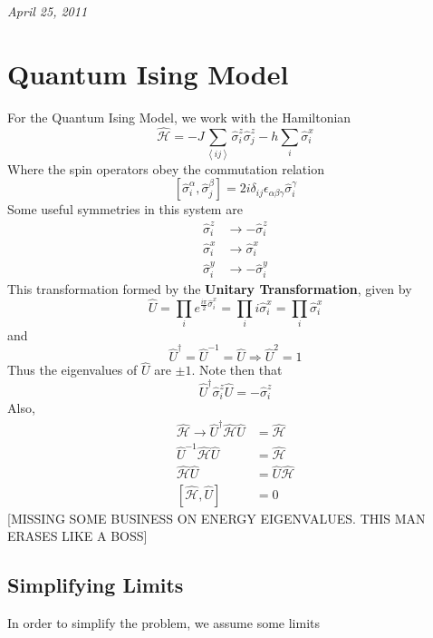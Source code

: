 \documentclass{article}
\begin{document}
	\textit{April 25, 2011}\\
	
	\section{Quantum Ising Model}
	For the Quantum Ising Model, we work with the Hamiltonian
	\begin{equation} \label{quantumIsing} \hat{\mathcal{H}}=-J\sum_{\left<ij\right>}\hat{\sigma}_i^z\hat{\sigma}_j^z-h\sum_i\hat{\sigma}_i^x\end{equation}
	Where the spin operators obey the commutation relation
	\begin{equation} \label{spinComm} \left[\hat{\sigma}_i^\alpha,\hat{\sigma}_j^\beta\right]=2i\delta_{ij}\epsilon_{\alpha\beta\gamma}\hat{\sigma}_i^\gamma \end{equation}
	Some useful symmetries in this system are
	\begin{align*}
		\hat{\sigma}_i^z&\longrightarrow -\hat{\sigma}_i^z\\
		\hat{\sigma}_i^x&\longrightarrow \hat{\sigma}_i^x\\
		\hat{\sigma}_i^y&\longrightarrow -\hat{\sigma}_i^y
	\end{align*}	
	This transformation formed by the \textbf{Unitary Transformation}, given by
	$$\hat{U}=\prod_i e^{\frac{i\pi}{2}\hat{\sigma}_i^x}=\prod_i i\hat{\sigma}_i^x=\prod_i \hat{\sigma}_i^x$$
	and
	$$\hat{U}^\dag=\hat{U}^{-1}=\hat{U}\Rightarrow \hat{U}^2=1$$
	Thus the eigenvalues of $\hat{U}$ are $\pm 1$. Note then that
	$$\hat{U}^\dag \hat{\sigma}^z_i\hat{U}=-\hat{\sigma}_i^z$$
	Also,
	\begin{align*}
		\hat{\mathcal{H}}\longrightarrow \hat{U}^\dag \hat{\mathcal{H}}\hat{U}&=\hat{\mathcal{H}}\\
		\hat{U}^{-1}\hat{\mathcal{H}}\hat{U}&=\hat{\mathcal{H}}\\
		\hat{\mathcal{H}}\hat{U}&=\hat{U}\hat{\mathcal{H}}\\
		 \left[\hat{\mathcal{H}},\hat{U}\right]&=0
	\end{align*}
	[MISSING SOME BUSINESS ON ENERGY EIGENVALUES. THIS MAN ERASES LIKE A BOSS]\\
	
	\subsection{Simplifying Limits}
	In order to simplify the problem, we assume some limits
\end{document}
